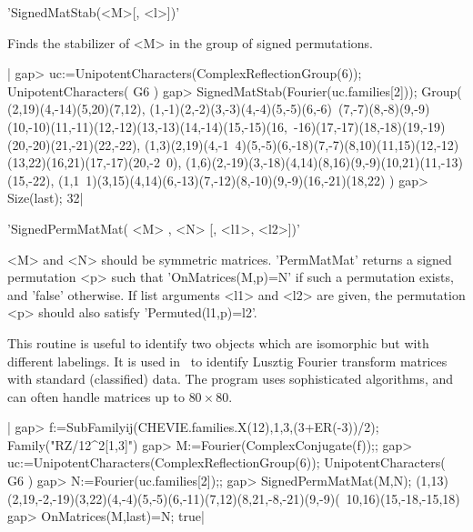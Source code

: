 'SignedMatStab(<M>[, <l>])'

Finds the stabilizer of <M> in the group of signed permutations.

|    gap> uc:=UnipotentCharacters(ComplexReflectionGroup(6));
    UnipotentCharacters( G6 )
    gap> SignedMatStab(Fourier(uc.families[2]));
    Group( (2,19)(4,-14)(5,20)(7,12), (1,-1)(2,-2)(3,-3)(4,-4)(5,-5)(6,-6)\
    (7,-7)(8,-8)(9,-9)(10,-10)(11,-11)(12,-12)(13,-13)(14,-14)(15,-15)(16,\
    -16)(17,-17)(18,-18)(19,-19)(20,-20)(21,-21)(22,-22), (1,3)(2,19)(4,-1\
    4)(5,-5)(6,-18)(7,-7)(8,10)(11,15)(12,-12)(13,22)(16,21)(17,-17)(20,-2\
    0), (1,6)(2,-19)(3,-18)(4,14)(8,16)(9,-9)(10,21)(11,-13)(15,-22), (1,1\
    1)(3,15)(4,14)(6,-13)(7,-12)(8,-10)(9,-9)(16,-21)(18,22) )
    gap> Size(last);
    32|

\Section{SignedPermMatMat}%
%

'SignedPermMatMat( <M> , <N> [, <l1>, <l2>])'

<M>  and <N>  should be  symmetric matrices.  'PermMatMat' returns a signed
permutation <p> such that 'OnMatrices(M,p)=N' if such a permutation exists,
and  'false'  otherwise.  If  list  arguments  <l1> and <l2> are given, the
permutation <p> should also satisfy 'Permuted(l1,p)=l2'.

This  routine is  useful to  identify two  objects which are isomorphic but
with  different  labelings.  It  is  used  in  \CHEVIE\ to identify Lusztig
Fourier  transform matrices  with standard  (classified) data.  The program
uses  sophisticated  algorithms,  and  can  often  handle  matrices  up  to
$80\times 80$.

|    gap> f:=SubFamilyij(CHEVIE.families.X(12),1,3,(3+ER(-3))/2);
    Family("RZ/12^2[1,3]")
    gap> M:=Fourier(ComplexConjugate(f));;
    gap> uc:=UnipotentCharacters(ComplexReflectionGroup(6));
    UnipotentCharacters( G6 )
    gap> N:=Fourier(uc.families[2]);;
    gap> SignedPermMatMat(M,N);
    (1,13)(2,19,-2,-19)(3,22)(4,-4)(5,-5)(6,-11)(7,12)(8,21,-8,-21)(9,-9)(\
    10,16)(15,-18,-15,18)
    gap> OnMatrices(M,last)=N;
    true|

